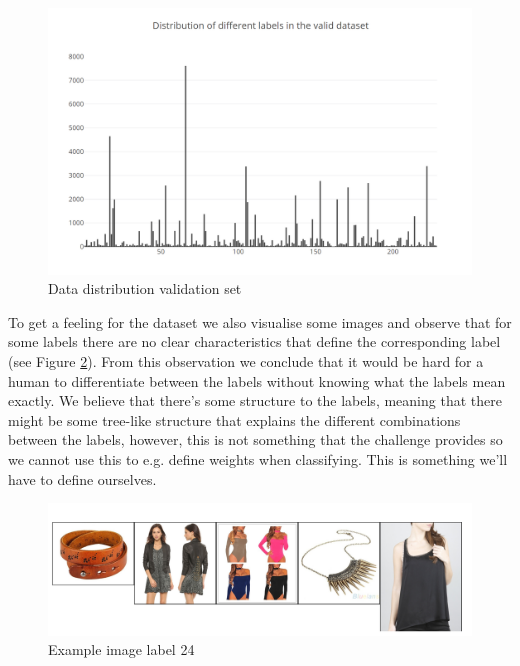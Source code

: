 \documentclass[10pt, a4paper]{article}
\begin{document}
\begin{multicols}{2}
        \begin{figure}[H]
            \centering
            \includegraphics[scale=.4]{img/dist_labels_validation.PNG}
            \caption{Data distribution validation set}
            \label{fig:data_dist_val}
        \end{figure}
        To get a feeling for the dataset we also visualise some images and observe that for some labels there are no clear characteristics that define the corresponding label (see Figure \ref{fig:img_example}). From this observation we conclude that it would be hard for a human to differentiate between the labels without knowing what the labels mean exactly. We believe that there's some structure to the labels, meaning that there might be some tree-like structure that explains the different combinations between the labels, however, this is not something that the challenge provides so we cannot use this to e.g. define weights when classifying. This is something we'll have to define ourselves.
        \begin{figure}[H]
            \centering
            \includegraphics[scale=.2]{img/label_24.jpg}
            \caption{Example image label 24}
            \label{fig:img_example}
        \end{figure}
	

\end{multicols}
\end{document}
